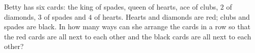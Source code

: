 Betty has six cards: the king of spades, queen of hearts, ace of clubs, $2$ of diamonds, $3$ of spades and $4$ of hearts. Hearts and diamonds are red; clubs and spades are black. In how many ways can she arrange the cards in a row so that the red cards are all next to each other and the black cards are all next to each other?
